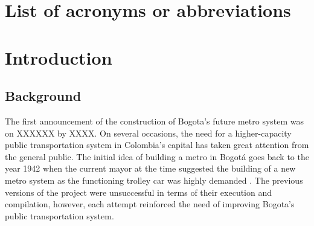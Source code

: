 \documentclass[12pt, a4paper]{report}
\begin{document}
\chapter*{List of acronyms or abbreviations}
\begin{sortedlist} %
  \end{sortedlist}
%
%
%
%
%
%
%

\chapter{Introduction} \label{Chap1}

\section{Background}

The first announcement of the construction of Bogota's future metro system was on XXXXXX by XXXX. On several occasions, the need for a higher-capacity public transportation system in Colombia's capital has taken great attention from the general public. The initial idea of building a metro in Bogot\'{a} goes back to the year 1942 when the current mayor at the time suggested the building of a new metro system as the functioning trolley car was highly demanded \citep{metrodebogotaHistoriaMetroBogota2011}. The previous versions of the project were unsuccessful in terms of their execution and compilation, however, each attempt reinforced the need of improving Bogota's public transportation system.
\end{document}
